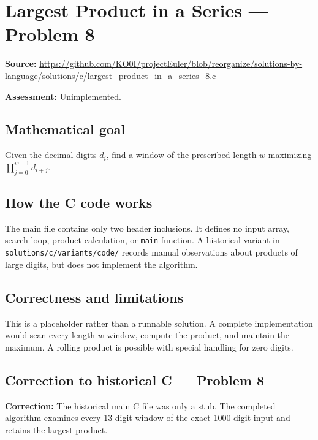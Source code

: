 \section{Largest Product in a Series --- Problem 8}
\label{prob:8}
\noindent\textbf{Source:} \url{https://github.com/KO0I/projectEuler/blob/reorganize/solutions-by-language/solutions/c/largest_product_in_a_series_8.c}

\noindent\textbf{Assessment:} Unimplemented.

\subsection*{Mathematical goal}
Given the decimal digits \(d_i\), find a window of the prescribed length \(w\) maximizing \(\prod_{j=0}^{w-1}d_{i+j}\).

\subsection*{How the C code works}
The main file contains only two header inclusions. It defines no input array, search loop, product calculation, or \verb|main| function. A historical variant in \verb|solutions/c/variants/code/| records manual observations about products of large digits, but does not implement the algorithm.

\subsection*{Correctness and limitations}
This is a placeholder rather than a runnable solution. A complete implementation would scan every length-\(w\) window, compute the product, and maintain the maximum. A rolling product is possible with special handling for zero digits.


\subsection*{Correction to historical C --- Problem 8}
{\color{red}\textbf{Correction:} The historical main C file was only a stub. The completed algorithm examines every 13-digit window of the exact 1000-digit input and retains the largest product.}
